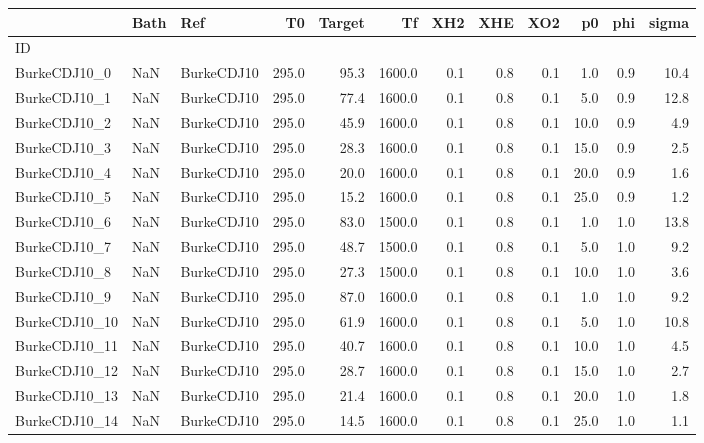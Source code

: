 \begin{tabular}{lllrrrrrrrrr}
\toprule
{} & Bath &         Ref &     T0 &  Target &     Tf &  XH2 &  XHE &  XO2 &   p0 &  phi &  sigma \\
\midrule
ID            &      &             &        &         &        &      &      &      &      &      &        \\
BurkeCDJ10\_0  &  NaN &  BurkeCDJ10 &  295.0 &    95.3 & 1600.0 &  0.1 &  0.8 &  0.1 &  1.0 &  0.9 &   10.4 \\
BurkeCDJ10\_1  &  NaN &  BurkeCDJ10 &  295.0 &    77.4 & 1600.0 &  0.1 &  0.8 &  0.1 &  5.0 &  0.9 &   12.8 \\
BurkeCDJ10\_2  &  NaN &  BurkeCDJ10 &  295.0 &    45.9 & 1600.0 &  0.1 &  0.8 &  0.1 & 10.0 &  0.9 &    4.9 \\
BurkeCDJ10\_3  &  NaN &  BurkeCDJ10 &  295.0 &    28.3 & 1600.0 &  0.1 &  0.8 &  0.1 & 15.0 &  0.9 &    2.5 \\
BurkeCDJ10\_4  &  NaN &  BurkeCDJ10 &  295.0 &    20.0 & 1600.0 &  0.1 &  0.8 &  0.1 & 20.0 &  0.9 &    1.6 \\
BurkeCDJ10\_5  &  NaN &  BurkeCDJ10 &  295.0 &    15.2 & 1600.0 &  0.1 &  0.8 &  0.1 & 25.0 &  0.9 &    1.2 \\
BurkeCDJ10\_6  &  NaN &  BurkeCDJ10 &  295.0 &    83.0 & 1500.0 &  0.1 &  0.8 &  0.1 &  1.0 &  1.0 &   13.8 \\
BurkeCDJ10\_7  &  NaN &  BurkeCDJ10 &  295.0 &    48.7 & 1500.0 &  0.1 &  0.8 &  0.1 &  5.0 &  1.0 &    9.2 \\
BurkeCDJ10\_8  &  NaN &  BurkeCDJ10 &  295.0 &    27.3 & 1500.0 &  0.1 &  0.8 &  0.1 & 10.0 &  1.0 &    3.6 \\
BurkeCDJ10\_9  &  NaN &  BurkeCDJ10 &  295.0 &    87.0 & 1600.0 &  0.1 &  0.8 &  0.1 &  1.0 &  1.0 &    9.2 \\
BurkeCDJ10\_10 &  NaN &  BurkeCDJ10 &  295.0 &    61.9 & 1600.0 &  0.1 &  0.8 &  0.1 &  5.0 &  1.0 &   10.8 \\
BurkeCDJ10\_11 &  NaN &  BurkeCDJ10 &  295.0 &    40.7 & 1600.0 &  0.1 &  0.8 &  0.1 & 10.0 &  1.0 &    4.5 \\
BurkeCDJ10\_12 &  NaN &  BurkeCDJ10 &  295.0 &    28.7 & 1600.0 &  0.1 &  0.8 &  0.1 & 15.0 &  1.0 &    2.7 \\
BurkeCDJ10\_13 &  NaN &  BurkeCDJ10 &  295.0 &    21.4 & 1600.0 &  0.1 &  0.8 &  0.1 & 20.0 &  1.0 &    1.8 \\
BurkeCDJ10\_14 &  NaN &  BurkeCDJ10 &  295.0 &    14.5 & 1600.0 &  0.1 &  0.8 &  0.1 & 25.0 &  1.0 &    1.1 \\

\end{tabular}

